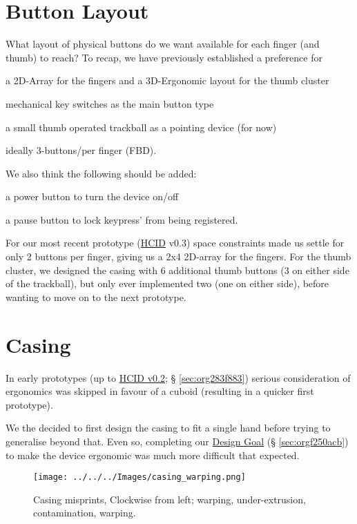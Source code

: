 \documentclass[logo,bsc,singlespacing,parskip]{infthesis}
\begin{document}
\section{Button Layout}
\label{sec:org68327cb}
What layout of physical buttons do we want available for each finger (and thumb) to reach?
To recap, we have previously established a preference for
\begin{enumerate*}[label={\arabic*)}, itemjoin={, \,}, itemjoin*={, and \,}]
\item a 2D-Array for the fingers and a 3D-Ergonomic layout for the thumb cluster
\item mechanical key switches as the main button type
\item a small thumb operated trackball as a pointing device (for now)
\item ideally 3-buttons/per finger (FBD).
\end{enumerate*}
We also think the following should be added:
\begin{enumerate*}[label={\arabic*)}, itemjoin={, \,}, itemjoin*={, and \,}]
\item a power button to turn the device on/off
\item a pause button to lock keypress' from being registered.
\end{enumerate*}

For our most recent prototype (\hyperref[org0c83164]{HCID} v0.3) space constraints made us settle for only 2 buttons per finger, giving us a 2x4 2D-array for the fingers.
For the thumb cluster, we designed the casing with 6 additional thumb buttons (3 on either side of the trackball), but only ever implemented two (one on either side), before wanting to move on to the next prototype.
\section{Casing}
\label{sec:org2af288b}
In early prototypes (up to \hyperref[sec:org283f883]{HCID v0.2}; § \ref{sec:org283f883}) serious consideration of ergonomics was skipped in favour of a cuboid (resulting in a quicker first prototype).

We the decided to first design the casing to fit a single hand before trying to generalise beyond that.
Even so, completing our \hyperref[sec:orgf250acb]{Design Goal} (§ \ref{sec:orgf250acb}) to make the device ergonomic was much more difficult that expected.

\begin{wrapfigure}{r}{0.6\textwidth}
\centering
\texttt{[image: ../../../Images/casing\_warping.png]}
\caption[Casing misprints]{\label{fig:casing_misprints}Casing misprints, Clockwise from left; warping, under-extrusion, contamination, warping.}
\end{wrapfigure}
\end{document}

